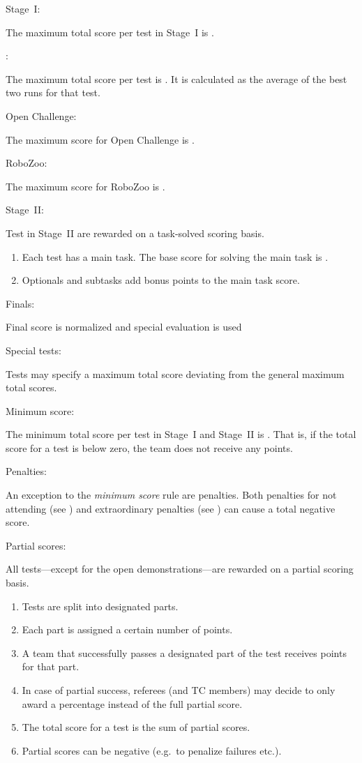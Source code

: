 \begin{enumerate}
  {\bf\item Stage~I:} The maximum total score per test in Stage~I is .
  \begin{enumerate}
    {\bf\item {}:} The maximum total score per test is . It is calculated as the average of the best two runs for that test.
    {\bf\item Open Challenge:} The maximum score for Open Challenge is .
    {\bf\item RoboZoo:} The maximum score for RoboZoo is .
  \end{enumerate}
  
  {\bf\item Stage~II:} Test in Stage~II are rewarded on a task-solved scoring basis.
  \begin{enumerate}
  \item Each test has a main task. The base score for solving the main task is .
  \item Optionals and subtasks add bonus points to the main task score.
  \end{enumerate}

  {\bf\item Finals:} Final score is normalized and special evaluation is used

  {\bf\item Special tests:} Tests may specify a maximum total score deviating from the general maximum total scores.
  {\bf\item Minimum score:} The minimum total score per test in Stage~I and Stage~II is . That is, if the total score for a test is below zero, the team does not receive any points.
  {\bf\item Penalties:} An exception to the \emph{minimum score} rule are penalties. Both penalties for not attending (see ) and extraordinary penalties (see ) can cause a total negative score. 
  {\bf\item Partial scores:} All tests---except for the open demonstrations---are rewarded on a partial scoring basis. 
  \begin{enumerate}
  \item Tests are split into designated parts.
  \item Each part is assigned a certain number of points.
  \item A team that successfully passes a designated part of the test receives points for that part.
  \item In case of partial success, referees (and TC members) may decide to only award a percentage instead of the full partial score.  
  \item The total score for a test is the sum of partial scores.
  \item Partial scores can be negative (e.g.~to penalize failures etc.).
  \end{enumerate}
\end{enumerate}


